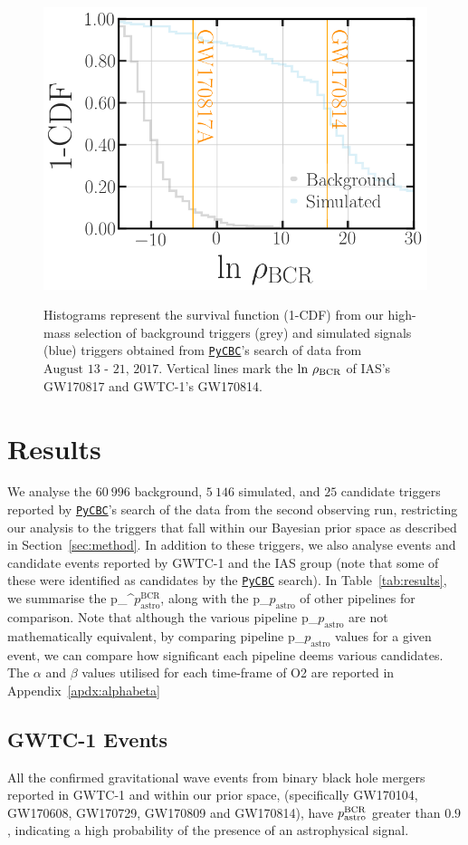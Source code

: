 \documentclass[%
 nofootinbib,
 amsmath,amssymb,
 aps,
 twocolumn
]{revtex4-2}
\newcommand{\pycbc}{{\sc \href{https://pycbc.org/}{\texttt{PyCBC}}}\xspace}
\newcommand{\fancytext}[1]{{\relax\ifmmode#1\else $#1$\fi}\xspace}
\newcommand{\mathcmd}[1]{{\sc \relax\ifmmode#1\else $#1$\fi}\xspace}
\newcommand{\bcr}{\mathcmd{\rho_\text{BCR}}}
\newcommand{\pastro}{\fancytext{p_\text{astro}}}
\newcommand{\pastrobcr}{\fancytext{p_\text{astro}^{\text{BCR}}}}
\begin{document}
\begin{figure}[!ht]
{\centering \includegraphics[width=0.75\linewidth]{images/bcr_cdf_smaller_legend.png} }
\caption[BCR distribution example]{Histograms represent the survival function (1-CDF) from our high-mass selection of background triggers (grey) and simulated signals (blue) triggers obtained from \pycbc's search of data from $\text{August 13 - 21, 2017}$. Vertical lines mark the $\text{ln}\ \bcr$ of IAS's GW170817 and GWTC-1's GW170814.}\label{fig:bcrCdf}
\end{figure}


\section{\label{sec:Results}Results}


We analyse the $60\ 996$ background, $5\ 146$ simulated, and $25$ candidate triggers reported by \pycbc's search of the data from the second observing run, restricting our analysis to the triggers that fall within our Bayesian prior space as described in Section~\ref{sec:method}. In addition to these triggers, we also analyse events and candidate events reported by GWTC-1 and the IAS group (note that some of these were identified as candidates by the \pycbc search). In Table~\ref{tab:results}, we summarise the \pastrobcr, along with the \pastro of other pipelines for comparison. Note that although the various pipeline \pastro are not mathematically equivalent, by comparing pipeline \pastro values for a given event, we can compare how significant each pipeline deems various candidates. The $\alpha$ and $\beta$ values utilised for each time-frame of O2 are reported in Appendix~\ref{apdx:alphabeta}


\subsection{GWTC-1 Events}
All the confirmed gravitational wave events from binary black hole mergers reported in GWTC-1 and within our prior space, (specifically GW170104, GW170608, GW170729, GW170809 and GW170814), have $\pastrobcr$ greater than $0.9$, indicating a high probability of the presence of an astrophysical signal. 
\end{document}
